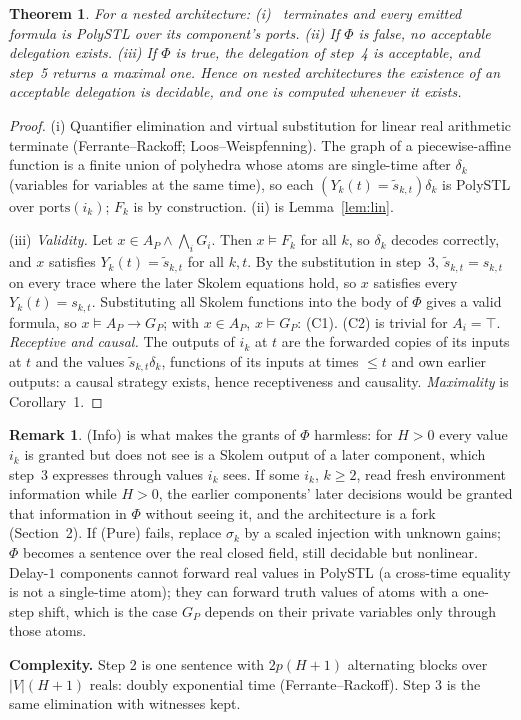 \documentclass[10pt]{article}
\theoremstyle{plain}\newtheorem{theorem}{Theorem}\newtheorem{lemma}{Lemma}\newtheorem{proposition}{Proposition}
\theoremstyle{definition}\newtheorem{definition}{Definition}\newtheorem{remark}{Remark}
\newcommand{\ports}{\mathrm{ports}}\newcommand{\inp}{\mathrm{in}}\newcommand{\outp}{\mathrm{out}}\newcommand{\priv}{\mathrm{priv}}\newcommand{\edge}{\mathrm{edge}}
\begin{document}
\begin{theorem}\label{thm:main}
For a nested architecture: (i) \Dl\ terminates and every emitted formula is PolySTL over its component's ports. (ii) If $\Phi$ is false, no acceptable delegation exists. (iii) If $\Phi$ is true, the delegation of step~4 is acceptable, and step~5 returns a maximal one. Hence on nested architectures the existence of an acceptable delegation is decidable, and one is computed whenever it exists.
\end{theorem}
\begin{proof}
(i) Quantifier elimination and virtual substitution for linear real arithmetic terminate (Ferrante--Rackoff; Loos--Weispfenning). The graph of a piecewise-affine function is a finite union of polyhedra whose atoms are single-time after $\delta_k$ (variables for variables at the same time), so each $(Y_k(t)=\tilde s_{k,t})\delta_k$ is PolySTL over $\ports(i_k)$; $F_k$ is by construction. (ii) is Lemma~\ref{lem:lin}.

(iii) \emph{Validity.} Let $x\in A_P\wedge\bigwedge_iG_i$. Then $x\models F_k$ for all $k$, so $\delta_k$ decodes correctly, and $x$ satisfies $Y_k(t)=\tilde s_{k,t}$ for all $k,t$. By the substitution in step~3, $\tilde s_{k,t}=s_{k,t}$ on every trace where the later Skolem equations hold, so $x$ satisfies every $Y_k(t)=s_{k,t}$. Substituting all Skolem functions into the body of $\Phi$ gives a valid formula, so $x\models A_P\to G_P$; with $x\in A_P$, $x\models G_P$: (C1). (C2) is trivial for $A_i=\top$.
\emph{Receptive and causal.} The outputs of $i_k$ at $t$ are the forwarded copies of its inputs at $t$ and the values $\tilde s_{k,t}\delta_k$, functions of its inputs at times $\le t$ and own earlier outputs: a causal strategy exists, hence receptiveness and causality. \emph{Maximality} is Corollary~1.
\end{proof}
\begin{remark}
(Info) is what makes the grants of $\Phi$ harmless: for $H>0$ every value $i_k$ is granted but does not see is a Skolem output of a later component, which step~3 expresses through values $i_k$ sees. If some $i_k$, $k\ge2$, read fresh environment information while $H>0$, the earlier components' later decisions would be granted that information in $\Phi$ without seeing it, and the architecture is a fork (Section~2). If (Pure) fails, replace $\sigma_k$ by a scaled injection with unknown gains; $\Phi$ becomes a sentence over the real closed field, still decidable but nonlinear. Delay-$1$ components cannot forward real values in PolySTL (a cross-time equality is not a single-time atom); they can forward truth values of atoms with a one-step shift, which is the case $G_P$ depends on their private variables only through those atoms.
\end{remark}
\textbf{Complexity.} Step 2 is one sentence with $2p(H+1)$ alternating blocks over $|V|(H+1)$ reals: doubly exponential time (Ferrante--Rackoff). Step 3 is the same elimination with witnesses kept.
\end{document}
